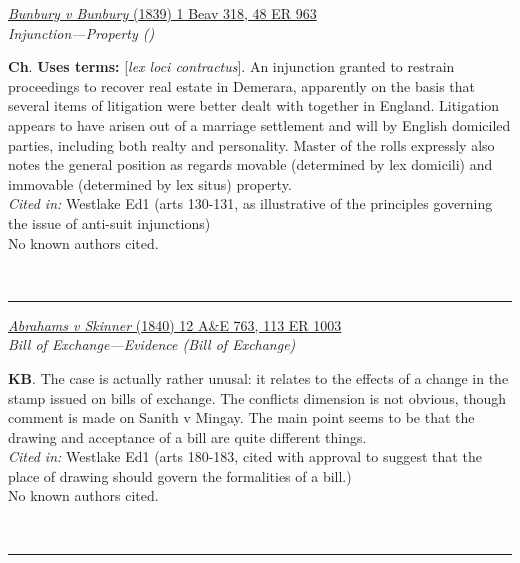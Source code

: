 \documentclass[twoside]{article}
\begin{document}
        \begin{small}
        \begin{center}
        \href{https://heinonline.org/HOL/P?h=hein.engrep/engrd0048&i=971}{\textit{Bunbury v Bunbury} (1839) 1 Beav 318, 48 ER 963} \label{98} \\ 
\textit{Injunction---Property ()}\\
        \end{center}
        \textbf{Ch}.  \textbf{Uses terms: }[\textit{lex loci contractus}]. An injunction granted to restrain proceedings to recover real estate in Demerara, apparently on the basis that several items of litigation were better dealt with together in England. Litigation appears to have arisen out of a marriage settlement and will by English domiciled parties, including both realty and personality. Master of the rolls expressly also notes the general position as regards movable (determined by lex domicili) and immovable (determined by lex situs) property.\\\textit{Cited in: }Westlake Ed1 (arts 130-131, as illustrative of the principles governing the issue of anti-suit injunctions)\\No known authors cited.
        \end{small}\\
        \rule{\textwidth}{0.5pt}
        

        \begin{small}
        \begin{center}
        \href{https://heinonline.org/HOL/P?h=hein.engrep/engrf0113&i=1007}{\textit{Abrahams v Skinner} (1840) 12 A\&E 763, 113 ER 1003} \label{83} \\ 
\textit{Bill of Exchange---Evidence (Bill of Exchange)}\\
        \end{center}
        \textbf{KB}. The case is actually rather unusal: it relates to the effects of a change in the stamp issued on bills of exchange. The conflicts dimension is not obvious, though comment is made on Sanith v Mingay. The main point seems to be that the drawing and acceptance of a bill are quite different things.\\\textit{Cited in: }Westlake Ed1 (arts 180-183, cited with approval to suggest that the place of drawing should govern the formalities of a bill.)\\No known authors cited.
        \end{small}\\
        \rule{\textwidth}{0.5pt}
        
\end{document}
